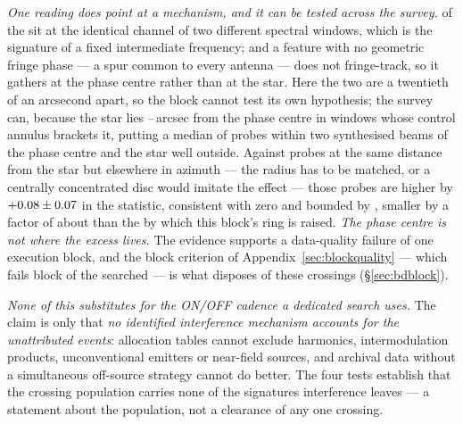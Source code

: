 \emph{One reading does point at a mechanism, and it can be tested across the
survey.} \DqBlockIfMult{} of the \DqBlockNCross{} sit at the identical
channel of two different spectral windows, which is the signature of a fixed
intermediate frequency; and a feature with no geometric fringe phase --- a
spur common to every antenna --- does not fringe-track, so it gathers at the
phase centre rather than at the star. Here the two are a
twentieth of an arcsecond apart, so the block cannot test its own hypothesis;
the survey can, because the star lies \EvPcOffLo--\EvPcOffHi\,arcsec from the
phase centre in \EvPcNWin{} windows whose control annulus brackets it,
putting a median of \EvPcNNear{} probes within two synthesised beams of the
phase centre and the star well outside. Against probes at the same distance
from the star but elsewhere in azimuth --- the radius has to be matched, or a
centrally concentrated disc would imitate the effect --- those probes are
higher by $+0.08\pm0.07$ in the statistic, consistent with zero and
bounded by \EvPcBound, smaller by a factor of about \EvPcFactor{} than the
\EvPcNeed{} by which this block's ring is raised. \emph{The phase centre is
not where the excess lives.} The evidence supports a data-quality failure of
one execution block, and the block criterion of
Appendix~\ref{sec:blockquality} --- which fails \BqNFail{} block of the
\BqNBlocks{} searched --- is what disposes of these \EvNCrossFlag{} crossings
(\S\ref{sec:bdblock}).

\emph{None of this substitutes for the ON/OFF cadence a dedicated search
uses.} The claim is only that \emph{no
identified interference mechanism accounts for the unattributed events}:
allocation tables cannot exclude harmonics, intermodulation products,
unconventional emitters or near-field sources, and archival data without a
simultaneous off-source strategy cannot do better. The four tests establish
that the crossing population carries none of the signatures interference
leaves --- a statement about the population, not a clearance of any one
crossing.


